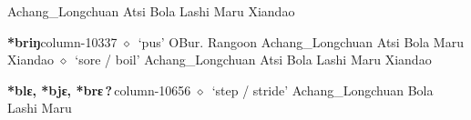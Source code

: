 \hspace{1ex}
         Achang\_Longchuan 
\hspace{1ex}
         Atsi 
\hspace{1ex}
         Bola 
\hspace{1ex}
         Lashi 
\hspace{1ex}
         Maru 
\hspace{1ex}
         Xiandao 
  \item {\footnotesize \textbf{*briŋ}}{\tiny column-10337}
         $\diamond$~`pus'
         OBur. 
\hspace{1ex}
         Rangoon 
\hspace{1ex}
         Achang\_Longchuan 
\hspace{1ex}
         Atsi 
\hspace{1ex}
         Bola 
\hspace{1ex}
         Maru 
\hspace{1ex}
         Xiandao 
\hspace{1ex}
         $\diamond$~`sore / boil'
         Achang\_Longchuan 
\hspace{1ex}
         Atsi 
\hspace{1ex}
         Bola 
\hspace{1ex}
         Lashi 
\hspace{1ex}
         Maru 
\hspace{1ex}
         Xiandao 
  \item {\footnotesize \textbf{*blɛ, *bjɛ, *brɛ\,?\,}}{\tiny column-10656}
         $\diamond$~`step / stride'
         Achang\_Longchuan 
\hspace{1ex}
         Bola 
\hspace{1ex}
         Lashi 
\hspace{1ex}
         Maru 
